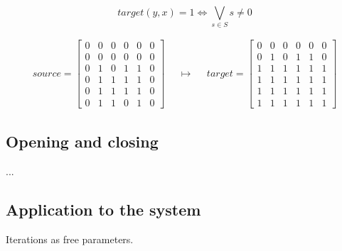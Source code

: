 \documentclass{report}
\begin{document}
\begin{equation}\label{eq:morph_dilation}
  target(y, x) = 1 \iff \bigvee_{s \in S} s \neq 0
\end{equation}

\begin{align}\label{eq:morph_dilation-example}
  source = \begin{bmatrix}
    0 & 0 & 0 & 0 & 0 & 0 \\
    0 & 0 & 0 & 0 & 0 & 0 \\
    0 & 1 & 0 & 1 & 1 & 0 \\
    0 & 1 & 1 & 1 & 1 & 0 \\
    0 & 1 & 1 & 1 & 1 & 0 \\
    0 & 1 & 1 & 0 & 1 & 0
  \end{bmatrix}
  & &
  \mapsto
  & &
  target = \begin{bmatrix}
    0 & 0 & 0 & 0 & 0 & 0 \\
    0 & 1 & 0 & 1 & 1 & 0 \\
    1 & 1 & 1 & 1 & 1 & 1 \\
    1 & 1 & 1 & 1 & 1 & 1 \\
    1 & 1 & 1 & 1 & 1 & 1 \\
    1 & 1 & 1 & 1 & 1 & 1
  \end{bmatrix}
\end{align}


\subsection{Opening and closing}
...


\subsection{Application to the system}

Iterations as free parameters.
\end{document}
